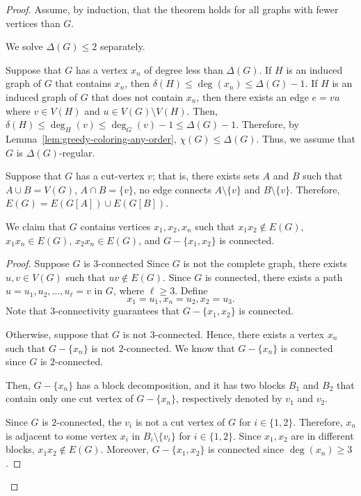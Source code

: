 \begin{proof}
    Assume, by induction, that the theorem holds for all graphs with fewer vertices than \(G\).

    We solve \(\Delta(G) \leq 2\) separately.

    Suppose that \(G\) has a vertex \(x_n\) of degree less than \(\Delta(G)\).
    If \(H\) is an induced graph of \(G\) that contains \(x_n\),
    then \(\delta(H) \leq \deg(x_n) \leq \Delta(G) - 1\).
    If \(H\) is an induced graph of \(G\) that does not contain \(x_n\),
    then there exists an edge \(e = vu\) where \(v \in V(H)\) and \(u \in V(G) \setminus V(H)\).
    Then, \(\delta(H) \leq \deg_H(v) \leq \deg_G(v) - 1 \leq \Delta(G) - 1\).
    Therefore, by Lemma~\ref{lem:greedy-coloring-any-order},
    \(\chi(G) \leq \Delta(G)\).
    Thus, we assume that \(G\) is \(\Delta(G)\)-regular.

    Suppose that \(G\) has a cut-vertex \(v\); that is, there exists sets \(A\) and \(B\) such that \(A \cup B = V(G)\), \(A \cap B = \{v\}\), no edge connects \(A \setminus \{v\}\) and \(B \setminus \{v\}\).
    Therefore, \(E(G) = E(G[A]) \cup E(G[B])\).

    We claim that \(G\) contains vertices \(x_1, x_2, x_n\) such that \(x_1x_2 \notin E(G)\), \(x_1x_n \in E(G)\), \(x_2x_n \in E(G)\), and \(G - \{x_1, x_2\}\) is connected.
    \begin{proof}
        Suppose \(G\) is \(3\)-connected
        Since \(G\) is not the complete graph,
        there exists \(u, v \in V(G)\) such that \(uv \notin E(G)\).
        Since \(G\) is connected, there exists a path \(u = u_1, u_2, \ldots, u_\ell = v\) in \(G\), where \(\ell \geq 3\).
        Define
        \begin{equation}
            x_1 = u_1, x_n = u_2, x_2 = u_3.
        \end{equation}
        Note that \(3\)-connectivity guarantees that \(G - \{x_1, x_2\}\) is connected.

        Otherwise, suppose that \(G\) is not \(3\)-connected.
        Hence, there exists a vertex \(x_n\) such that \(G - \{x_n\}\) is not \(2\)-connected.
        We know that \(G - \{x_n\}\) is connected since \(G\) is \(2\)-connected.

        Then, \(G - \{x_n\}\) has a block decomposition, and it has two blocks \(B_1\) and \(B_2\) that contain only one cut vertex of \(G - \{x_n\}\), respectively denoted by \(v_1\) and \(v_2\).

        Since \(G\) is \(2\)-connected, the \(v_i\) is not a cut vertex of \(G\) for \(i \in \{1, 2\}\).
        Therefore, \(x_n\) is adjacent to some vertex \(x_i\) in \(B_i \setminus \{v_i\}\) for \(i \in \{1, 2\}\).
        Since \(x_1, x_2\) are in different blocks, \(x_1x_2 \notin E(G)\).
        Moreover, \(G - \{x_1, x_2\}\) is connected since \(\deg(x_n) \geq 3\).
    \end{proof}


\end{proof}
